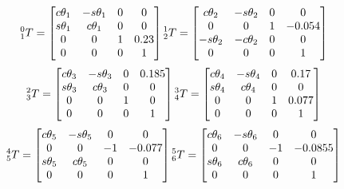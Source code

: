 \documentclass[12pt]{article}
\begin{document}
\[
    ^0_1T=
    \left[
        \begin{matrix}
            c\theta_1 & -s\theta_1 & 0 & 0    \\
            s\theta_1 & c\theta_1  & 0 & 0    \\
            0         & 0          & 1 & 0.23 \\
            0         & 0          & 0 & 1
        \end{matrix}  \right] \nonscript
    ^1_2T=
    \left[
        \begin{matrix}
            c\theta_2  & -s\theta_2 & 0 & 0      \\
            0          & 0          & 1 & -0.054 \\
            -s\theta_2 & -c\theta_2 & 0 & 0      \\
            0          & 0          & 0 & 1
        \end{matrix}  \right]
\]
\[
    ^2_3T=
    \left[
        \begin{matrix}
            c\theta_3 & -s\theta_3 & 0 & 0.185 \\
            s\theta_3 & c\theta_3  & 0 & 0     \\
            0         & 0          & 1 & 0     \\
            0         & 0          & 0 & 1
        \end{matrix}  \right] \nonscript
    ^3_4T=
    \left[
        \begin{matrix}
            c\theta_4 & -s\theta_4 & 0 & 0.17 \\
            s\theta_4 & c\theta_4  & 0 & 0     \\
            0         & 0          & 1 & 0.077 \\
            0         & 0          & 0 & 1
        \end{matrix}  \right]
\]\[
    ^4_5T=
    \left[
        \begin{matrix}
            c\theta_5 & -s\theta_5 & 0 & 0      \\
            0         & 0          & -1 & -0.077 \\
            s\theta_5 & c\theta_5  & 0 & 0      \\
            0         & 0          & 0 & 1
        \end{matrix}  \right] \nonscript
    ^5_6T=
    \left[
        \begin{matrix}
            c\theta_6 & -s\theta_6 & 0  & 0       \\
            0         & 0          & -1 & -0.0855 \\
            s\theta_6 & c\theta_6  & 0  & 0       \\
            0         & 0          & 0  & 1
        \end{matrix}  \right] \nonscript
\]
\end{document}
